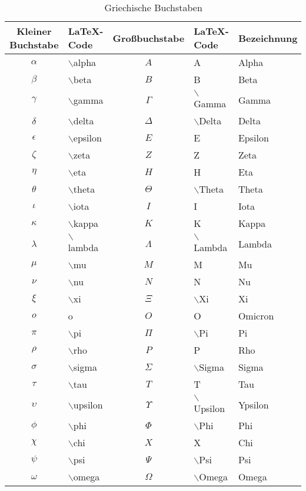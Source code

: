 \begin{table}[t]
\centering
\begin{tabular}{c|l|c|l|l}
\hline
\textbf{Kleiner Buchstabe} & \textbf{\LaTeX-Code} & \textbf{Großbuchstabe} & \textbf{\LaTeX-Code} & \textbf{Bezeichnung} \\
\hline
$\alpha $ & $\backslash$alpha & $A $ & A & Alpha \\
$\beta $ & $\backslash$beta & $B $ & B & Beta \\
$\gamma $ & $\backslash$gamma & $\Gamma $ & $\backslash$Gamma & Gamma \\
$\delta $ & $\backslash$delta & $\Delta $ & $\backslash$Delta & Delta \\
$\epsilon$ & $\backslash$epsilon  & $E $ & E & Epsilon \\
$\zeta $ & $\backslash$zeta & $Z $ & Z & Zeta \\
$\eta $ & $\backslash$eta & $H $ & H &  Eta\\
$\theta $ & $\backslash$theta & $\Theta $ & $\backslash$Theta & Theta \\
$\iota $ & $\backslash$iota & $I $ & I & Iota \\
$\kappa $ & $\backslash$kappa & $K $ & K & Kappa \\
$\lambda $ & $\backslash$lambda & $\Lambda $ & $\backslash$Lambda & Lambda \\
$\mu $ & $\backslash$mu & $M $ & M & Mu \\
$\nu $ & $\backslash$nu & $N $ & N & Nu \\
$\xi $ & $\backslash$xi & $\Xi $ & $\backslash$Xi &  Xi \\
$o $ & o & $O $ & O & Omicron \\
$\pi $ & $\backslash$pi & $\Pi $ & $\backslash$Pi & Pi \\
$\rho $ & $\backslash$rho & $P $ & P & Rho \\
$\sigma $ & $\backslash$sigma & $\Sigma $ & $\backslash$Sigma & Sigma  \\
$\tau $ & $\backslash$tau & $T $ & T & Tau \\
$\upsilon $ & $\backslash$upsilon & $\Upsilon $ & $\backslash$Upsilon & Ypsilon \\
$\phi $ & $\backslash$phi & $\Phi $ & $\backslash$Phi & Phi \\
$\chi $ & $\backslash$chi & $X $ & X & Chi \\
$\psi $ & $\backslash$psi & $\Psi $ & $\backslash$Psi & Psi \\
$\omega $ & $\backslash$omega & $\Omega $ & $\backslash$Omega & Omega \\
\hline
\end{tabular}
\caption{Griechische Buchstaben}
\label{tab:greek}
\end{table}

